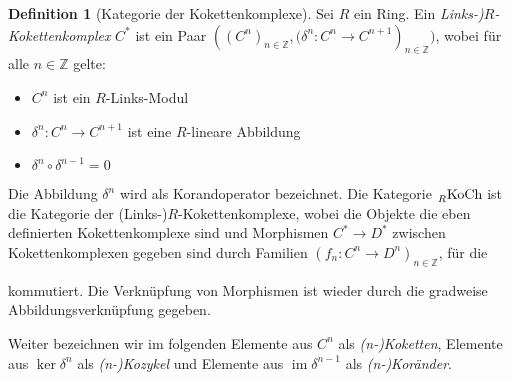 \documentclass[a4paper,twoside,10pt]{scrreprt}
\DeclareMathOperator{\img}{im}
\newcommand{\Z}{\mathbb{Z}}
\theoremstyle{definition}
\newtheorem{definition}[satz]{Definition}
\begin{document}
\begin{definition}[Kategorie der Kokettenkomplexe]\label{def:CatCoChainComplex}
Sei $R$ ein Ring. Ein \emph{Links-)$R$-Kokettenkomplex} $C^*$ ist ein Paar $\left(\left(C^n \right)_{n\in \Z},\bigl(\delta^n:C^n\to C^{n+1}\right)_{n\in \Z}\bigr)$, wobei für alle $n\in \Z$ gelte:
\begin{itemize}
\item $C^n$ ist ein $R$-Links-Modul
\item $\delta^n:C^n\to C^{n+1}$ ist eine $R$-lineare Abbildung
\item $\delta^n\circ \delta^{n-1}=0$
\end{itemize}
Die Abbildung $\delta^n$ wird als Korandoperator bezeichnet.
Die Kategorie $\prescript{}{R}{\text{KoCh}}$ ist die Kategorie der (Links-)$R$-Kokettenkomplexe, wobei die Objekte die eben definierten Kokettenkomplexe sind und Morphismen $C^*\to D^*$ zwischen Kokettenkomplexen gegeben sind durch Familien $(f_n:C^n\to D^n)_{n\in\Z}$, für die
\begin{center}
\end{center}
kommutiert. Die Verknüpfung von Morphismen ist wieder durch die gradweise Abbildungsverknüpfung gegeben.\par
Weiter bezeichnen wir im folgenden Elemente aus $C^n$ als \textit{(n-)Koketten}, Elemente aus $\ker\delta^n$ als \textit{(n-)Kozykel} und Elemente aus $\img\delta^{n-1}$ als \textit{(n-)Koränder}.
\end{definition}
\end{document}
